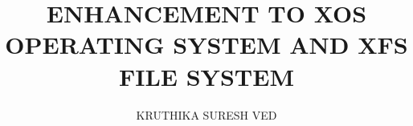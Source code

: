 \documentclass[modernstyle,12pt]{thesis}
\title{\uppercase{Enhancement to XOS Operating System and XFS file system}}
\author{\uppercase{KRUTHIKA SURESH VED}} {\uppercase{B110300CS}} {\uppercase{SIKHA V MANOJ}} {\uppercase{B110572CS}} {\uppercase{SONIA V MATHEW}} {\uppercase{B110495CS}}
\begin{document}














\nocite{*}      %



\appendix   %


\end{document}
